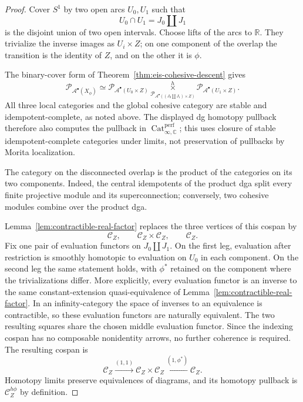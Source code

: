 \documentclass[12pt]{amsart}
\theoremstyle{definition}
\theoremstyle{remark}
\numberwithin{equation}{section}
\newcommand{\CA}{\mathcal A}
\newcommand{\C}{\mathbb C}
\newcommand{\R}{\mathbb R}
\begin{document}
\begin{proof}
Cover \(S^1\) by two open arcs \(U_0,U_1\) such that
\[
U_0\cap U_1=J_0\amalg J_1
\]
is the disjoint union of two open intervals.  Choose lifts of the arcs to
\(\R\).  They trivialize the inverse images as \(U_i\times Z\); on one
component of the overlap the transition is the identity of \(Z\), and on
the other it is \(\phi\).

The binary-cover form of
Theorem~\ref{thm:eis-cohesive-descent} gives
\[
\mathcal P_{\CA^\bullet(X_\phi)}
\simeq
\mathcal P_{\CA^\bullet(U_0\times Z)}
\mathop{\times}\limits^h_{
\mathcal P_{\CA^\bullet((J_0\amalg J_1)\times Z)}
}
\mathcal P_{\CA^\bullet(U_1\times Z)}.
\]
All three local categories and the global cohesive category are stable and
idempotent-complete, as noted above.  The displayed dg homotopy pullback
therefore also computes the pullback in
\(\operatorname{Cat}^{\mathrm{perf}}_{\infty,\C}\); this uses closure of
stable idempotent-complete categories under limits, not preservation of
pullbacks by Morita localization.

The category on the disconnected overlap is the product of the categories
on its two components.  Indeed, the central idempotents of the product dga
split every finite projective module and its superconnection; conversely,
two cohesive modules combine over the product dga.

Lemma~\ref{lem:contractible-real-factor} replaces the three vertices of this
cospan by
\[
\mathcal C_Z,\qquad
\mathcal C_Z\times\mathcal C_Z,\qquad
\mathcal C_Z.
\]
Fix one pair of evaluation functors on \(J_0\amalg J_1\).  On the first
leg, evaluation after restriction is smoothly homotopic to evaluation on
\(U_0\) in each component.  On the second leg the same statement holds,
with \(\phi^*\) retained on the component where the trivializations differ.
More explicitly, every evaluation functor is an inverse to the same
constant-extension quasi-equivalence of
Lemma~\ref{lem:contractible-real-factor}.  In an infinity-category the space
of inverses to an equivalence is contractible, so these evaluation functors
are naturally equivalent.  The two resulting squares share the chosen
middle evaluation functor.  Since the indexing cospan has no composable
nonidentity arrows, no further coherence is required.  The resulting
cospan is
\[
\mathcal C_Z
\xrightarrow{(1,1)}
\mathcal C_Z\times\mathcal C_Z
\xleftarrow{(1,\phi^*)}
\mathcal C_Z.
\]
Homotopy limits preserve equivalences of diagrams, and its homotopy
pullback is \(\mathcal C_Z^{h\phi}\) by definition.
\end{proof}
\end{document}
